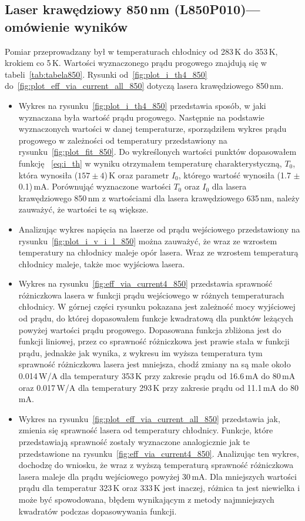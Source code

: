\subsection{Laser krawędziowy 850\,nm (L850P010)--- omówienie wyników}
Pomiar przeprowadzany był w temperaturach chłodnicy od 283\,K do 353\,K, krokiem co 5\,K. Wartości wyznaczonego prądu progowego
znajdują się w tabeli~\ref{tab:tabela850}. Rysunki od~\ref{fig:plot_i_th4_850} do~\ref{fig:plot_eff_via_current_all_850} dotyczą lasera
krawędziowego 850\,nm.
\begin{itemize}
\item Wykres na rysunku~\ref{fig:plot_i_th4_850} przedstawia sposób, w jaki wyznaczana była wartość prądu progowego. Następnie na podstawie
wyznaczonych wartości w danej temperaturze, sporządziłem wykres prądu progowego w zależności od temperatury
przedstawiony na rysunku~\ref{fig:plot_fit_850}. Do wykreślonych wartości punktów dopasowałem funkcję ~\ref{eq:i_th} w wyniku otrzymałem
temperaturę charakterystyczną, $T_0$, która wynosiła ($157 \pm 4$)\,K oraz parametr $I_0$, którego wartość wynosiła (1.7 $\pm$ 0.1)\,mA.
Porównująć wyznaczone wartości $T_0$ oraz $I_0$ dla lasera krawędziowego 850\,nm z wartościami dla lasera krawędziowego 635\,nm, należy
zauważyć, że wartości te są większe.
\item Analizując wykres napięcia na laserze od prądu wejściowego przedstawiony na rysunku~\ref{fig:plot_i_v_i_l_850}
można zauważyć, że wraz ze wzrostem temperatury na chłodnicy
maleje opór lasera. Wraz ze wzrostem temperaturą chłodnicy maleje, także moc wyjściowa lasera.
\item Wykres na rysunku~\ref{fig:eff_via_current4_850} przedstawia sprawność różniczkowa lasera w funkcji prądu wejściowego
w różnych temperaturach chłodnicy. W górnej części rysunku pokazana jest zależność mocy wyjściowej od prądu, do której dopasowałem
funkcje kwadratową dla punktów leżących powyżej wartości prądu progowego. Dopasowana funkcja zbliżona jest do funkcji liniowej, przez co sprawność różniczkowa jest
prawie stała w funkcji prądu, jednakże jak wynika, z wykresu im wyższa temperatura tym sprawność różniczkowa lasera jest mniejsza, chodź zmiany na
są małe około 0.014\,W/A dla temperatury 353\,K przy zakresie prądu od 16.6\,mA do 80\,mA oraz 0.017\,W/A dla temperatury 293\,K
przy zakresie prądu od 11.1\,mA do 80\,mA.
\item Wykres na rysunku~\ref{fig:plot_eff_via_current_all_850} przedstawia jak, zmienia się sprawność lasera od temperatury chłodnicy.
Funkcje, które przedstawiają sprawność zostały wyznaczone analogicznie jak te przedstawione na rysunku~\ref{fig:eff_via_current4_850}.
Analizując ten wykres, dochodzę do wniosku, że wraz z wyższą temperaturą sprawność różniczkowa lasera maleje dla prądu wejściowego powyżej
30\,mA. Dla mniejszych wartości prądu dla temperatur 323\,K oraz 333\,K jest inaczej, różnica ta jest niewielka i może być spowodowana, błędem
wynikającym z metody najmniejszych kwadratów podczas dopasowywania funkcji.
\end{itemize}
